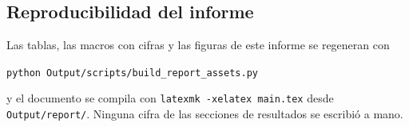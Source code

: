 \subsection{Reproducibilidad del informe}
Las tablas, las macros con cifras y las figuras de este informe se regeneran con
\begin{center}\small\texttt{python Output/scripts/build\_report\_assets.py}\end{center}
y el documento se compila con \texttt{latexmk -xelatex main.tex} desde
\texttt{Output/report/}.
Ninguna cifra de las secciones de resultados se escribió a mano.
